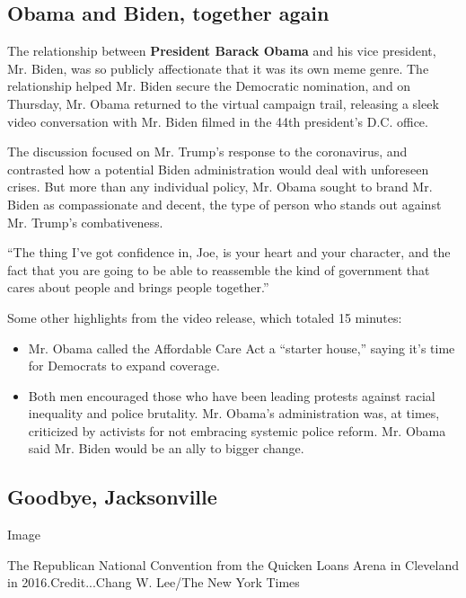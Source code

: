 \hypertarget{obama-and-biden-together-again}{%
\subsection{Obama and Biden, together
again}\label{obama-and-biden-together-again}}

The relationship between \textbf{President Barack Obama} and his vice
president, Mr. Biden, was so publicly affectionate that it was its own
meme genre. The relationship helped Mr. Biden secure the Democratic
nomination, and on Thursday, Mr. Obama returned to the virtual campaign
trail, releasing a sleek video conversation with Mr. Biden filmed in the
44th president's D.C. office.

The discussion focused on Mr. Trump's response to the coronavirus, and
contrasted how a potential Biden administration would deal with
unforeseen crises. But more than any individual policy, Mr. Obama sought
to brand Mr. Biden as compassionate and decent, the type of person who
stands out against Mr. Trump's combativeness.

``The thing I've got confidence in, Joe, is your heart and your
character, and the fact that you are going to be able to reassemble the
kind of government that cares about people and brings people together.''

Some other highlights from the video release, which totaled 15 minutes:

\begin{itemize}
\item
  Mr. Obama called the Affordable Care Act a ``starter house,'' saying
  it's time for Democrats to expand coverage.
\item
  Both men encouraged those who have been leading protests against
  racial inequality and police brutality. Mr. Obama's administration
  was, at times, criticized by activists for not embracing systemic
  police reform. Mr. Obama said Mr. Biden would be an ally to bigger
  change.
\end{itemize}

\hypertarget{goodbye-jacksonville}{%
\subsection{Goodbye, Jacksonville}\label{goodbye-jacksonville}}

Image

The Republican National Convention from the Quicken Loans Arena in
Cleveland in 2016.Credit...Chang W. Lee/The New York Times

